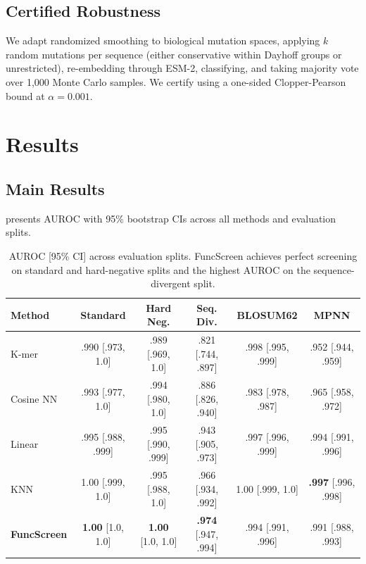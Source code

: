 \documentclass[11pt,a4paper]{article}
\begin{document}
\subsection{Certified Robustness}

We adapt randomized smoothing \cite{cohen2019certified} to biological mutation spaces, applying $k$ random mutations per sequence (either conservative within Dayhoff groups \cite{dayhoff1978model} or unrestricted), re-embedding through ESM-2, classifying, and taking majority vote over 1,000 Monte Carlo samples. We certify using a one-sided Clopper-Pearson bound at $\alpha = 0.001$.

\section{Results}

\subsection{Main Results}

 presents AUROC with 95\% bootstrap CIs across all methods and evaluation splits.

\begin{table}[H]
\centering
\caption{AUROC [95\% CI] across evaluation splits. FuncScreen achieves perfect screening on standard and hard-negative splits and the highest AUROC on the sequence-divergent split.}
\label{tab:main_results}
\small
\begin{tabular}{@{}lccccc@{}}
\toprule
\textbf{Method} & \textbf{Standard} & \textbf{Hard Neg.} & \textbf{Seq. Div.} & \textbf{BLOSUM62} & \textbf{MPNN} \\
\midrule
K-mer & .990 [.973, 1.0] & .989 [.969, 1.0] & .821 [.744, .897] & .998 [.995, .999] & .952 [.944, .959] \\
Cosine NN & .993 [.977, 1.0] & .994 [.980, 1.0] & .886 [.826, .940] & .983 [.978, .987] & .965 [.958, .972] \\
Linear & .995 [.988, .999] & .995 [.990, .999] & .943 [.905, .973] & .997 [.996, .999] & .994 [.991, .996] \\
KNN & 1.00 [.999, 1.0] & .995 [.988, 1.0] & .966 [.934, .992] & 1.00 [.999, 1.0] & \textbf{.997} [.996, .998] \\
\textbf{FuncScreen} & \textbf{1.00} [1.0, 1.0] & \textbf{1.00} [1.0, 1.0] & \textbf{.974} [.947, .994] & .994 [.991, .996] & .991 [.988, .993] \\
\bottomrule
\end{tabular}
\end{table}
\end{document}
